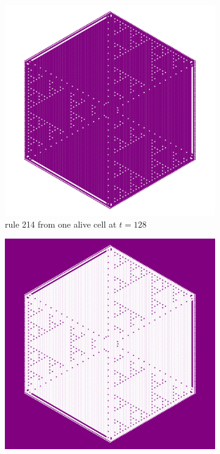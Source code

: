 \documentclass{article}
\begin{document}
\begin{figure}[H]
     \centering
     \begin{subfigure}[b]{0.48\textwidth}
         \centering
         \includegraphics[width=\textwidth]{graphics/behavior/twins/rule-214-OneAlive.pdf}
         \caption{rule 214 from one alive cell at $t=128$}
         \label{fig:twin-1}
     \end{subfigure}
     \hspace{0.02\textwidth}
     \begin{subfigure}[b]{0.48\textwidth}
         \centering
         \includegraphics[width=\textwidth]{graphics/behavior/twins/rule-148-OneDead.pdf}

\end{subfigure}
\end{figure}
\end{document}
